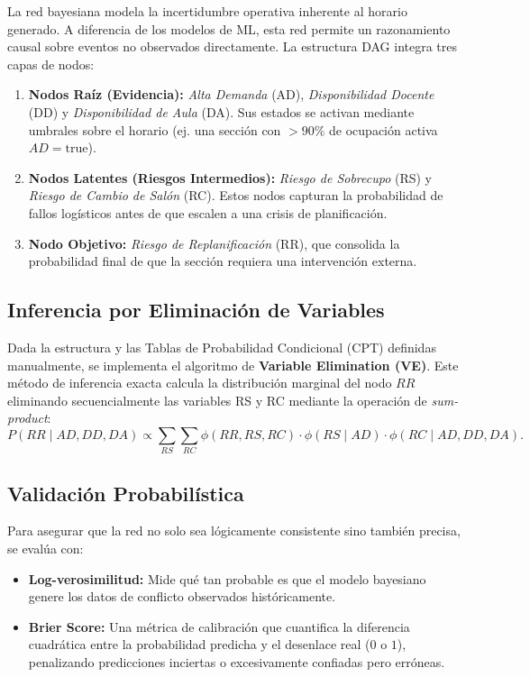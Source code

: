 \documentclass[12pt,twoside]{report}
\theoremstyle{definition}
\begin{document}
La red bayesiana modela la incertidumbre operativa inherente al horario generado. A diferencia de los modelos de ML, esta red permite un razonamiento causal sobre eventos no observados directamente. La estructura DAG integra tres capas de nodos:
\begin{enumerate}
    \item \textbf{Nodos Ra\'iz (Evidencia):} \emph{Alta Demanda} (AD), \emph{Disponibilidad Docente} (DD) y \emph{Disponibilidad de Aula} (DA). Sus estados se activan mediante umbrales sobre el horario (ej. una secci\'on con $>90\%$ de ocupaci\'on activa $AD=\text{true}$).
    \item \textbf{Nodos Latentes (Riesgos Intermedios):} \emph{Riesgo de Sobrecupo} (RS) y \emph{Riesgo de Cambio de Sal\'on} (RC). Estos nodos capturan la probabilidad de fallos log\'isticos antes de que escalen a una crisis de planificaci\'on.
    \item \textbf{Nodo Objetivo:} \emph{Riesgo de Replanificaci\'on} (RR), que consolida la probabilidad final de que la secci\'on requiera una intervenci\'on externa.
\end{enumerate}

\subsection{Inferencia por Eliminaci\'on de Variables}

Dada la estructura y las Tablas de Probabilidad Condicional (CPT) definidas manualmente, se implementa el algoritmo de \textbf{Variable Elimination (VE)}. Este m\'etodo de inferencia exacta calcula la distribuci\'on marginal del nodo $RR$ eliminando secuencialmente las variables RS y RC mediante la operaci\'on de \emph{sum-product}:
\begin{equation}
  P(RR \mid AD, DD, DA) \propto \sum_{RS} \sum_{RC} \phi(RR, RS, RC) \cdot \phi(RS \mid AD) \cdot \phi(RC \mid AD, DD, DA).
\end{equation}

\subsection{Validaci\'on Probabil\'istica}

Para asegurar que la red no solo sea l\'ogicamente consistente sino tambi\'en precisa, se eval\'ua con:
\begin{itemize}
    \item \textbf{Log-verosimilitud:} Mide qu\'e tan probable es que el modelo bayesiano genere los datos de conflicto observados hist\'oricamente.
    \item \textbf{Brier Score:} Una m\'etrica de calibraci\'on que cuantifica la diferencia cuadr\'atica entre la probabilidad predicha y el desenlace real ($0$ o $1$), penalizando predicciones inciertas o excesivamente confiadas pero err\'oneas.
\end{itemize}
\end{document}
